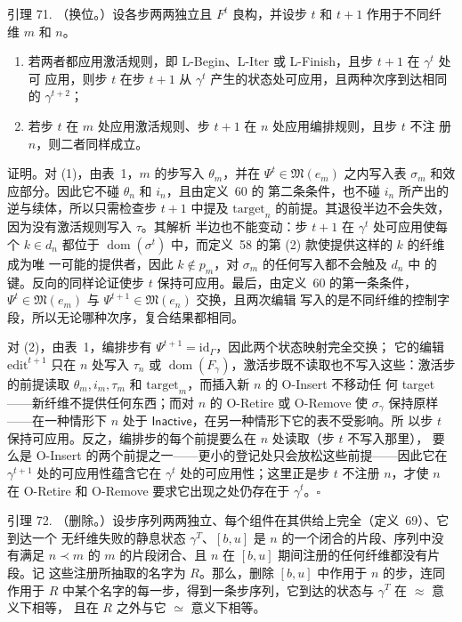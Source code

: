 引理 71. （换位。）设各步两两独立且 \(F^{t}\) 良构，并设步 \(t\) 和 \(t+1\) 作用于不同纤
维 \(m\) 和 \(n\)。

\begin{enumerate}
\def\labelenumi{\arabic{enumi}.}
\tightlist
\item
  若两者都应用激活规则，即 L-Begin、L-Iter 或 L-Finish，且步 \(t+1\) 在 \(\gamma^{t}\) 处可
  应用，则步 \(t\) 在步 \(t+1\) 从 \(\gamma^{t}\) 产生的状态处可应用，且两种次序到达相同的
  \(\gamma^{t+2}\)；
\item
  若步 \(t\) 在 \(m\) 处应用激活规则、步 \(t+1\) 在 \(n\) 处应用编排规则，且步 \(t\) 不注
  册 \(n\)，则二者同样成立。
\end{enumerate}

证明。对 (1)，由表~1，\(m\) 的步写入 \(\theta_{m}\)，并在 \(\Psi^{t} \in \mathfrak{M}(e_{m})\)
之内写入表 \(\sigma_{m}\) 和效应部分。因此它不碰 \(\theta_{n}\) 和 \(i_{n}\)，且由定义~60 的
第二条条件，也不碰 \(i_{n}\) 所产出的逆与续体，所以只需检查步 \(t+1\) 中提及
\(\mathrm{target}_{n}\) 的前提。其退役半边不会失效，因为没有激活规则写入 \(\tau\)。其解析
半边也不能变动：步 \(t+1\) 在 \(\gamma^{t}\) 处可应用使每个 \(k \in d_{n}\) 都位于
\(\operatorname{dom}(\sigma^{t})\) 中，而定义~58 的第 (2) 款使提供这样的 \(k\) 的纤维成为唯
一可能的提供者，因此 \(k \notin p_{m}\)，对 \(\sigma_{m}\) 的任何写入都不会触及 \(d_{n}\) 中
的键。反向的同样论证使步 \(t\) 保持可应用。最后，由定义~60 的第一条条件，
\(\Psi^{t} \in \mathfrak{M}(e_{m})\) 与 \(\Psi^{t+1} \in \mathfrak{M}(e_{n})\) 交换，且两次编辑
写入的是不同纤维的控制字段，所以无论哪种次序，复合结果都相同。

对 (2)，由表~1，编排步有 \(\Psi^{t+1} = \mathrm{id}_{\Gamma}\)，因此两个状态映射完全交换；
它的编辑 \(\mathrm{edit}^{t+1}\) 只在 \(n\) 处写入 \(\tau_{n}\) 或
\(\operatorname{dom}(F_{\gamma})\)，激活步既不读取也不写入这些：激活步的前提读取
\(\theta_{m}, i_{m}, \tau_{m}\) 和 \(\mathrm{target}_{m}\)，而插入新 \(n\) 的 O-Insert 不移动任
何 target——新纤维不提供任何东西；而对 \(n\) 的 O-Retire 或 O-Remove 使 \(\sigma_{\gamma}\)
保持原样——在一种情形下 \(n\) 处于 \(\mathsf{Inactive}\)，在另一种情形下它的表不受影响。所
以步 \(t\) 保持可应用。反之，编排步的每个前提要么在 \(n\) 处读取（步 \(t\) 不写入那里），
要么是 O-Insert 的两个前提之一——更小的登记处只会放松这些前提——因此它在
\(\gamma^{t+1}\) 处的可应用性蕴含它在 \(\gamma^{t}\) 处的可应用性；这里正是步 \(t\) 不注册
\(n\)，才使 \(n\) 在 O-Retire 和 O-Remove 要求它出现之处仍存在于 \(\gamma^{t}\)。\(\square\)

引理 72. （删除。）设步序列两两独立、每个组件在其供给上完全（定义~69）、它到达一个
无纤维失败的静息状态 \(\gamma^{T}\)、\([b, u]\) 是 \(n\) 的一个闭合的片段、序列中没有满足
\(n \prec m\) 的 \(m\) 的片段闭合、且 \(n\) 在 \([b, u]\) 期间注册的任何纤维都没有片段。记
这些注册所抽取的名字为 \(R\)。那么，删除 \([b, u]\) 中作用于 \(n\) 的步，连同作用于 \(R\)
中某个名字的每一步，得到一条步序列，它到达的状态与 \(\gamma^{T}\) 在 \(\approx\) 意义下相等，
且在 \(R\) 之外与它 \(\simeq\) 意义下相等。

